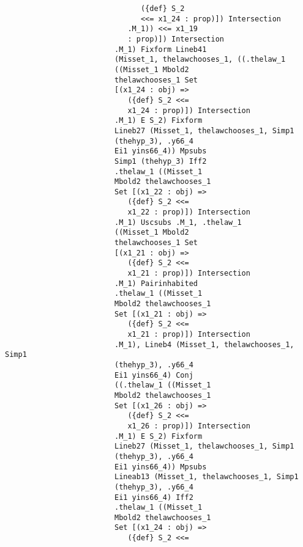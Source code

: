 \documentclass{article}
\begin{document}
\begin{verbatim}
                               ({def} S_2 
                               <<= x1_24 : prop)]) Intersection 
                            .M_1)) <<= x1_19 
                            : prop)]) Intersection 
                         .M_1) Fixform Lineb41 
                         (Misset_1, thelawchooses_1, ((.thelaw_1 
                         ((Misset_1 Mbold2 
                         thelawchooses_1 Set 
                         [(x1_24 : obj) => 
                            ({def} S_2 <<= 
                            x1_24 : prop)]) Intersection 
                         .M_1) E S_2) Fixform 
                         Lineb27 (Misset_1, thelawchooses_1, Simp1 
                         (thehyp_3), .y66_4 
                         Ei1 yins66_4)) Mpsubs 
                         Simp1 (thehyp_3) Iff2 
                         .thelaw_1 ((Misset_1 
                         Mbold2 thelawchooses_1 
                         Set [(x1_22 : obj) => 
                            ({def} S_2 <<= 
                            x1_22 : prop)]) Intersection 
                         .M_1) Uscsubs .M_1, .thelaw_1 
                         ((Misset_1 Mbold2 
                         thelawchooses_1 Set 
                         [(x1_21 : obj) => 
                            ({def} S_2 <<= 
                            x1_21 : prop)]) Intersection 
                         .M_1) Pairinhabited 
                         .thelaw_1 ((Misset_1 
                         Mbold2 thelawchooses_1 
                         Set [(x1_21 : obj) => 
                            ({def} S_2 <<= 
                            x1_21 : prop)]) Intersection 
                         .M_1), Lineb4 (Misset_1, thelawchooses_1, Simp1 
                         (thehyp_3), .y66_4 
                         Ei1 yins66_4) Conj 
                         ((.thelaw_1 ((Misset_1 
                         Mbold2 thelawchooses_1 
                         Set [(x1_26 : obj) => 
                            ({def} S_2 <<= 
                            x1_26 : prop)]) Intersection 
                         .M_1) E S_2) Fixform 
                         Lineb27 (Misset_1, thelawchooses_1, Simp1 
                         (thehyp_3), .y66_4 
                         Ei1 yins66_4)) Mpsubs 
                         Lineab13 (Misset_1, thelawchooses_1, Simp1 
                         (thehyp_3), .y66_4 
                         Ei1 yins66_4) Iff2 
                         .thelaw_1 ((Misset_1 
                         Mbold2 thelawchooses_1 
                         Set [(x1_24 : obj) => 
                            ({def} S_2 <<= 

\end{verbatim}
\end{document}
